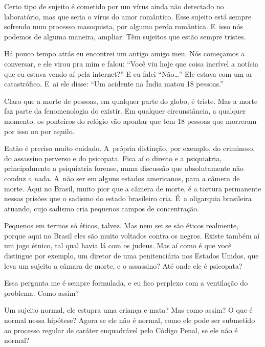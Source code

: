  

Certo tipo de sujeito é cometido por um vírus ainda não detectado no
laboratório, mas que seria o vírus do amor romântico. Esse sujeito
está sempre sofrendo num processo masoquista, por alguma perda
romântica. E~isso nós podemos de alguma maneira, ampliar. Têm
sujeitos que estão sempre tristes.

 

Há pouco tempo atrás eu encontrei um antigo amigo meu. Nós começamos a
conversar, e ele virou pra mim e falou: ``Você viu hoje que coisa
incrível a notícia que eu estava vendo aí pela internet?'' E eu falei
``Não…'' Ele estava com um ar catastrófico. E~ai ele disse: ``Um
acidente na Índia matou 18 pessoas.''

 

Claro que a morte de pessoas, em qualquer parte do globo, é triste. Mas
a morte faz parte da fenomenologia do existir. Em qualquer
circunstância, a qualquer momento, os ponteiros do relógio vão apontar
que tem 18 pessoas que morreram por isso ou por aquilo.

 

Então é preciso muito cuidado. A~própria distinção, por exemplo, do
criminoso, do assassino perverso e do psicopata. Fica aí o direito e a
psiquiatria, principalmente a psiquiatria forense, numa discussão que
absolutamente não conduz a nada. A~não ser em alguns estados americanos,
para a câmera de morte. Aqui no Brasil, muito pior que a câmera de
morte, é a tortura permanente nessas prisões que o sadismo do estado
brasileiro cria. É~a oligarquia brasileira atuando, cujo sadismo cria
pequenos campos de concentração.

 

Pequenos em termos só éticos, talvez. Mas nem sei se são éticos
realmente, porque aqui no Brasil eles são muito voltados contra os
negros. Existe também aí um jogo étnico, tal qual havia lá com os
judeus. Mas aí como é que você distingue por exemplo, um diretor de uma
penitenciária nos Estados Unidos, que leva um sujeito a câmara de morte,
e o assassino? Até onde ele é psicopata?

 

Essa pergunta me é sempre formulada, e eu fico perplexo com a ventilação
do problema. Como assim?

 

Um sujeito normal, ele estupra uma criança e mata? Mas como assim? O que
é normal nessa hipótese? Agora se ele não é normal, como ele pode ser
submetido ao processo regular de caráter enquadrável pelo Código Penal,
se ele não é normal?

